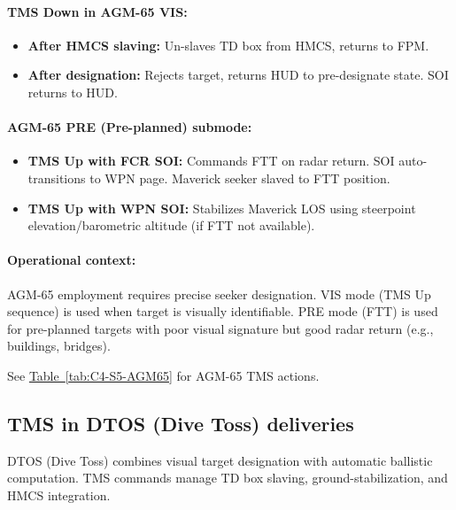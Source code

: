 \documentclass[11pt, a4paper, twoside]{report}
\newcommand{\tabref}[1]{\hyperref[#1]{Table~\ref*{#1}}}
\begin{document}
\paragraph{TMS Down in AGM-65 VIS:}
\begin{itemize}
    \item \textbf{After HMCS slaving:} Un-slaves TD box from HMCS, returns to FPM.
    \item \textbf{After designation:} Rejects target, returns HUD to pre-designate state. SOI returns to HUD.
\end{itemize}

\paragraph{AGM-65 PRE (Pre-planned) submode:}
\begin{itemize}
    \item \textbf{TMS Up with FCR SOI:} Commands FTT on radar return. SOI auto-transitions to WPN page. Maverick seeker slaved to FTT position.
    \item \textbf{TMS Up with WPN SOI:} Stabilizes Maverick LOS using steerpoint elevation/barometric altitude (if FTT not available).
\end{itemize}

\paragraph{Operational context:}
AGM-65 employment requires precise seeker designation. VIS mode (TMS Up sequence) is used when target is visually identifiable. PRE mode (FTT) is used for pre-planned targets with poor visual signature but good radar return (e.g., buildings, bridges).

See \tabref{tab:C4-S5-AGM65} for AGM-65 TMS actions.

\subsection{TMS in DTOS (Dive Toss) deliveries}
\label{sec:C4-S5-S2}

DTOS (Dive Toss) combines visual target designation with automatic ballistic computation. TMS commands manage TD box slaving, ground-stabilization, and HMCS integration.
\end{document}
